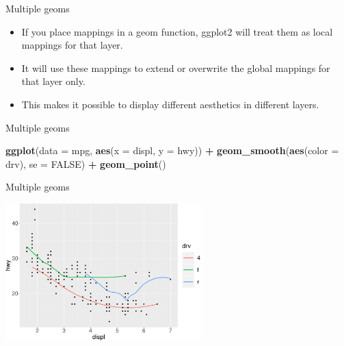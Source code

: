 \documentclass[ignorenonframetext,]{beamer}
\newenvironment{Shaded}{\begin{snugshade}}{\end{snugshade}}
\newcommand{\DataTypeTok}[1]{\textcolor[rgb]{0.13,0.29,0.53}{#1}}
\newcommand{\KeywordTok}[1]{\textcolor[rgb]{0.13,0.29,0.53}{\textbf{#1}}}
\newcommand{\NormalTok}[1]{#1}
\newcommand{\OperatorTok}[1]{\textcolor[rgb]{0.81,0.36,0.00}{\textbf{#1}}}
\newcommand{\OtherTok}[1]{\textcolor[rgb]{0.56,0.35,0.01}{#1}}
\newcommand{\StringTok}[1]{\textcolor[rgb]{0.31,0.60,0.02}{#1}}
\begin{document}
\begin{frame}{Multiple geoms}
\protect\hypertarget{multiple-geoms-7}{}

\begin{itemize}
\item
  If you place mappings in a geom function, ggplot2 will treat them as
  local mappings for that layer.
\item
  It will use these mappings to extend or overwrite the global mappings
  for that layer only.
\item
  This makes it possible to display different aesthetics in different
  layers.
\end{itemize}

\end{frame}

\begin{frame}[fragile]{Multiple geoms}
\protect\hypertarget{multiple-geoms-8}{}

\begin{Shaded}
\begin{Highlighting}[]
\KeywordTok{ggplot}\NormalTok{(}\DataTypeTok{data =}\NormalTok{ mpg, }\KeywordTok{aes}\NormalTok{(}\DataTypeTok{x =}\NormalTok{ displ, }\DataTypeTok{y =}\NormalTok{ hwy)) }\OperatorTok{+}\StringTok{ }
\StringTok{  }\KeywordTok{geom_smooth}\NormalTok{(}\KeywordTok{aes}\NormalTok{(}\DataTypeTok{color =}\NormalTok{ drv), }\DataTypeTok{se =} \OtherTok{FALSE}\NormalTok{) }\OperatorTok{+}
\StringTok{  }\KeywordTok{geom_point}\NormalTok{()}
\end{Highlighting}
\end{Shaded}

\end{frame}

\begin{frame}{Multiple geoms}
\protect\hypertarget{multiple-geoms-9}{}

\begin{center}\includegraphics[height=200px]{data-visualization_files/figure-beamer/unnamed-chunk-87-1} \end{center}

\end{frame}
\end{document}
